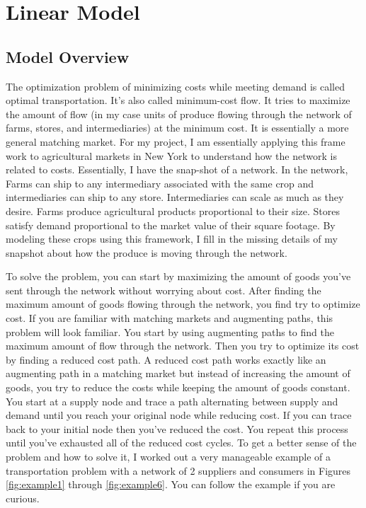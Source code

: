 \documentclass{report}
\begin{document}
\chapter{Linear Model}

\section{Model Overview}

The optimization problem of minimizing costs while meeting demand is called optimal transportation. It's also called minimum-cost flow. It tries to maximize the amount of flow (in my case units of produce flowing through the network of farms, stores, and intermediaries) at the minimum cost.  It is essentially a more general matching market. For my project, I am essentially applying this frame work to agricultural markets in New York to understand how the network is related to costs. Essentially, I have the snap-shot of a network. In the network, Farms can ship to any intermediary associated with the same crop and intermediaries can ship to any store. Intermediaries can scale as much as they desire. Farms produce agricultural products proportional to their size. Stores satisfy demand proportional to the market value of their square footage. By modeling these crops using this framework, I fill in the missing details of my snapshot about how the produce is moving through the network.

To solve the problem, you can start by maximizing the amount of goods you've sent through the network without worrying about cost.  After finding the maximum amount of goods flowing through the network, you find try to optimize cost.  If you are familiar with matching markets and augmenting paths, this problem will look familiar. You start by using augmenting paths to find the maximum amount of flow through the network. Then you try to optimize its cost by finding a reduced cost path. A reduced cost path works exactly like an augmenting path in a matching market but instead of increasing the amount of goods, you try to reduce the costs while keeping the amount of goods constant. You start at a supply node and trace a path alternating between supply and demand until you reach your original node while reducing cost. If you can trace back to your initial node then you've reduced the cost. You repeat this process until you've exhausted all of the reduced cost cycles. To get a better sense of the problem and how to  solve it, I worked out a very manageable example of a transportation problem with a network of 2 suppliers and consumers in Figures \ref{fig:example1} through \ref{fig:example6}. You can follow the example if you are curious.
\end{document}

